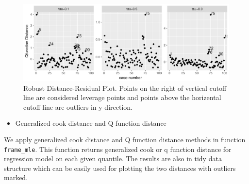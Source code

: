 \documentclass[11pt,a4paper,]{article}
\providecommand{\tightlist}{%
  \setlength{\itemsep}{0pt}\setlength{\parskip}{0pt}}
\theoremstyle{definition}
\theoremstyle{definition}
\theoremstyle{remark}
\begin{document}
\begin{figure}

{\centering \includegraphics{Diagnosing_outliers_and_visualization_of_quantile_regression_models_files/figure-latex/unnamed-chunk-6-1} 

}

\caption{Robust Distance-Residual Plot. Points on the right of vertical cutoff line are considered leverage points and points above the horizental cutoff line are outliers in y-direction.}\label{fig:unnamed-chunk-6}
\end{figure}

\begin{itemize}
\tightlist
\item
  Generalized cook distance and Q function distance
\end{itemize}

We apply generalized cook distance and Q function distance methods in
function \texttt{frame\_mle}. This function returns generalized cook or
q function distance for regression model on each given quantile. The
results are also in tidy data structure which can be easily used for
plotting the two distances with outliers marked.
\end{document}
